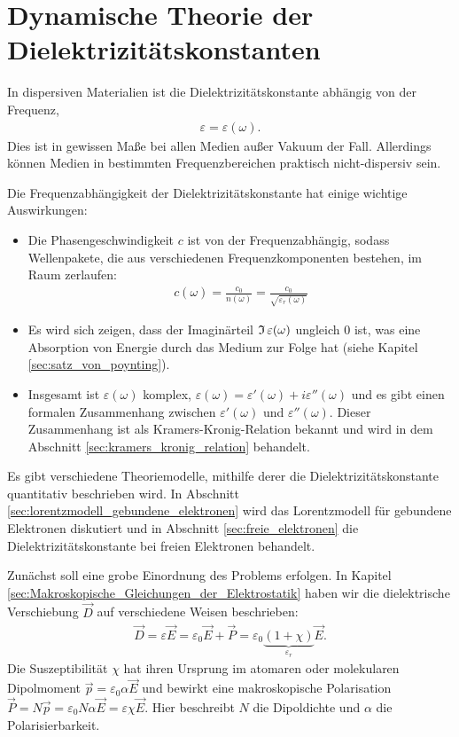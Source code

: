 \section{Dynamische Theorie der Dielektrizitätskonstanten}

In dispersiven Materialien ist die Dielektrizitätskonstante abhängig von der Frequenz,
\begin{align*}
    \varepsilon=\varepsilon(\omega).
\end{align*}
Dies ist in gewissen Maße bei allen Medien außer Vakuum der Fall. Allerdings können Medien in bestimmten Frequenzbereichen praktisch nicht-dispersiv sein.

Die Frequenzabhängigkeit der Dielektrizitätskonstante hat einige wichtige Auswirkungen:
\begin{itemize}
    \item Die Phasengeschwindigkeit $c$ ist von der Frequenzabhängig, sodass Wellenpakete, die aus verschiedenen Frequenzkomponenten bestehen, im Raum zerlaufen:
          \begin{align*}
              c(\omega) = \frac{c_0}{n(\omega)} = \frac{c_0}{\sqrt{\varepsilon_r(\omega)}}
          \end{align*}
    \item Es wird sich zeigen, dass der Imaginärteil $\operatorname{\mathfrak{I}}\varepsilon(\omega)$ ungleich 0 ist, was eine Absorption von Energie durch das Medium zur Folge hat (siehe Kapitel \ref{sec:satz_von_poynting}).
    \item Insgesamt ist $\varepsilon(\omega)$ komplex, $\varepsilon(\omega) = \varepsilon'(\omega) + i\varepsilon''(\omega)$ und es gibt einen formalen Zusammenhang zwischen $\varepsilon'(\omega)$ und $\varepsilon''(\omega)$. Dieser Zusammenhang ist als Kramers-Kronig-Relation bekannt und wird in dem Abschnitt \ref{sec:kramers_kronig_relation} behandelt.
\end{itemize}

Es gibt verschiedene Theoriemodelle, mithilfe derer die Dielektrizitätskonstante quantitativ beschrieben wird.
In Abschnitt \ref{sec:lorentzmodell_gebundene_elektronen} wird das Lorentzmodell für gebundene Elektronen diskutiert und in Abschnitt \ref{sec:freie_elektronen} die Dielektrizitätskonstante bei freien Elektronen behandelt.


Zunächst soll eine grobe Einordnung des Problems erfolgen.
In Kapitel \ref{sec:Makroskopische_Gleichungen_der_Elektrostatik} haben wir die dielektrische Verschiebung $\vec D$ auf verschiedene Weisen beschrieben:
\begin{align*}
    \vec D= \varepsilon \vec E=\varepsilon_0 \vec E+\vec P=\varepsilon_0 \underbrace{(1+\chi)}_{\varepsilon _r }\vec E.
\end{align*}
Die Suszeptibilität $\chi$ hat ihren Ursprung im atomaren oder molekularen Dipolmoment $\vec p=\varepsilon_0 \alpha\vec E$ und bewirkt eine makroskopische Polarisation
$\vec P=N\vec p = \varepsilon_0 N\alpha\vec E = \varepsilon\chi\vec E$. Hier beschreibt $N$ die Dipoldichte und $\alpha$ die Polarisierbarkeit.

